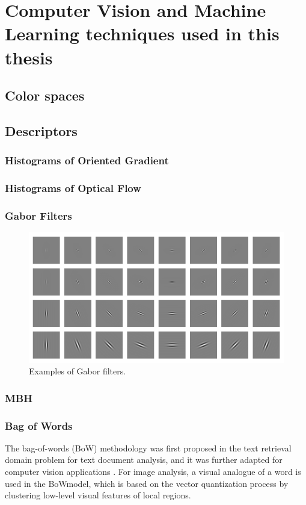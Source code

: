 
\chapter{Computer Vision and Machine Learning techniques used in this thesis}


\section{Color spaces}
\section{Descriptors}
\subsection{Histograms of Oriented Gradient}
\subsection{Histograms of Optical Flow}
\subsection{Gabor Filters}
\label{Gabor}
\begin{figure}[htbp]
	\centering
		\includegraphics[width=\linewidth]{Figures/gabor.png}
	\caption{Examples of Gabor filters.}
	\label{fig:Gabor}
\end{figure}
\subsection{MBH}
\subsection{Bag of Words}
The bag-of-words (BoW) methodology was first proposed in the text retrieval domain problem for text document analysis, and it was further adapted for computer vision applications \cite{bosch2007best}. For image analysis, a visual analogue of a word is used in the BoWmodel, which is based on the vector quantization process by clustering low-level visual features of local regions. 

